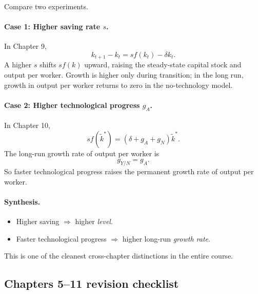 \documentclass[12pt]{article}
\begin{document}
\begin{examplebox}[title={Worked Example: Higher saving rate versus faster technological progress}]
Compare two experiments.

\paragraph{Case 1: Higher saving rate $s$.}
In Chapter 9,
\[
k_{t+1}-k_t=sf(k_t)-\delta k_t.
\]
A higher $s$ shifts $sf(k)$ upward, raising the steady-state capital stock and output per worker. Growth is higher only during transition; in the long run, growth in output per worker returns to zero in the no-technology model.

\paragraph{Case 2: Higher technological progress $g_A$.}
In Chapter 10,
\[
sf(\tilde{k}^*)=(\delta+g_A+g_N)\tilde{k}^*.
\]
The long-run growth rate of output per worker is
\[
g_{Y/N}=g_A.
\]
So faster technological progress raises the permanent growth rate of output per worker.

\paragraph{Synthesis.}
\begin{itemize}[leftmargin=1.5em]
    \item Higher saving $\Rightarrow$ higher \emph{level}.
    \item Faster technological progress $\Rightarrow$ higher long-run \emph{growth rate}.
\end{itemize}
This is one of the cleanest cross-chapter distinctions in the entire course.
\end{examplebox}

\subsection{Chapters 5--11 revision checklist}
\end{document}

